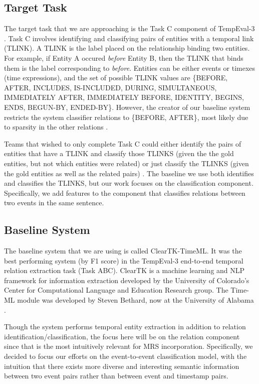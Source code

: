 \documentclass[11pt]{article}
\begin{document}
\subsection{Target Task}

The target task that we are approaching is the Task C component of TempEval-3 \cite{UzZaman:13}. Task C involves identifying and classifying pairs of entities with a temporal link (TLINK). A TLINK is the label placed on the relationship binding two entities. For example, if Entity A occured \textit{before} Entity B, then the TLINK that binds them is the label corresponding to \textit{before}. Entities can be either events or timexes (time expressions), and the set of possible TLINK values are \{BEFORE, AFTER, INCLUDES, IS-INCLUDED, DURING, SIMULTANEOUS, IMMEDIATELY AFTER, IMMEDIATELY BEFORE, IDENTITY, BEGINS, ENDS, BEGUN-BY, ENDED-BY\}. However, the creator of our baseline system restricts the system classifier relations to \{BEFORE, AFTER\}, most likely due to sparsity in the other relations \cite{Bethard:13}.

Teams that wished to only complete Task C could either identify the pairs of entities that have a TLINK and classify those TLINKS (given the the gold entities, but not which entities were related) or just classify the TLINKS (given the gold entities as well as the related pairs) \cite{UzZaman:13}. The baseline we use both identifies and classifies the TLINKS, but our work focuses on the classification component. Specifically, we add features to the component that classifies relations between two events in the same sentence.

\subsection{Baseline System}

The baseline system that we are using is called ClearTK-TimeML. It was the best performing system (by F1 score) in the TempEval-3 end-to-end temporal relation extraction task (Task ABC). ClearTK is a machine learning and NLP framework for information extraction developed by the University of Colorado's Center for Computational Language and Education Research group. The Time-ML module was developed by Steven Bethard, now at the University of Alabama \cite{Bethard:14}.

Though the system performs temporal entity extraction in addition to relation identification/classification, the focus here will be on the relation component since that is the most intuitively relevant for MRS incorporation. Specifically, we decided to focus our efforts on the event-to-event classification model, with the intuition that there exists more diverse and interesting semantic information between two event pairs rather than between event and timestamp pairs.
\end{document}
